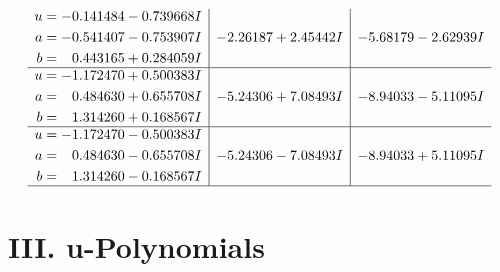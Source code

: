 \documentclass[1p]{elsarticle_modified}
\theoremstyle{definition}
\begin{document}
$$\begin{array}{c|c|c}
\begin{aligned}
u &= -0.141484 - 0.739668 I \\
a &= -0.541407 - 0.753907 I \\
b &= \phantom{-}0.443165 + 0.284059 I\end{aligned}
 & -2.26187 + 2.45442 I & -5.68179 - 2.62939 I \\ \hline\begin{aligned}
u &= -1.172470 + 0.500383 I \\
a &= \phantom{-}0.484630 + 0.655708 I \\
b &= \phantom{-}1.314260 + 0.168567 I\end{aligned}
 & -5.24306 + 7.08493 I & -8.94033 - 5.11095 I \\ \hline\begin{aligned}
u &= -1.172470 - 0.500383 I \\
a &= \phantom{-}0.484630 - 0.655708 I \\
b &= \phantom{-}1.314260 - 0.168567 I\end{aligned}
 & -5.24306 - 7.08493 I & -8.94033 + 5.11095 I\\
 \hline 
 \end{array}$$\newpage
\newpage\renewcommand{\arraystretch}{1}
\centering \section*{ III. u-Polynomials}
\end{document}
